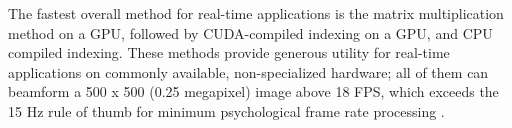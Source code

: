 The fastest overall method for real-time applications is the matrix multiplication method on a GPU, followed by CUDA-compiled indexing on a GPU, and CPU compiled indexing. These methods provide generous utility for real-time applications on commonly available, non-specialized hardware; all of them can beamform a 500 x 500 (0.25 megapixel) image above 18 FPS, which exceeds the 15 Hz rule of thumb for minimum psychological frame rate processing \cite{chenReviewLowFrame2007}.

\newpage